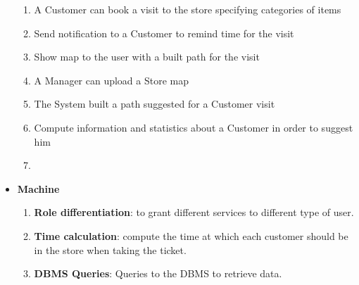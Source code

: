 \documentclass[a4paper, 10pt, oneside]{article}
\newcommand*{\lorenzo}[1]{\textcolor{BurntOrange}{#1}}
\newcommand{\giovanni}[1]{\textcolor{Blue}{#1}}
\begin{document}
\begin{itemize}
\begin{enumerate}[label={S.S.\arabic{*}}]
        
        \item A Customer can book a visit to the store specifying categories of items
        \item Send notification to a Customer to remind time for the visit
        \item Show map to the user with a built path for the visit
        
        \item A Manager can upload a Store map
        \item The System built a path suggested for a Customer visit
        
        \item Compute information and statistics about a Customer in order to suggest him 
        
        
        
        
        \item
    \end{enumerate}
    \item {\large \textbf{Machine}}
    \begin{enumerate}[label={S.M.\arabic{*}}]
        \item \textbf{Role differentiation}:  to grant different services to different type of user.
        \item \textbf{Time calculation}: compute the time at which each customer should be in the store when taking the ticket.
        \item \textbf{DBMS Queries}: Queries to the DBMS to retrieve data.
        

\end{enumerate}
\end{itemize}
\end{document}
